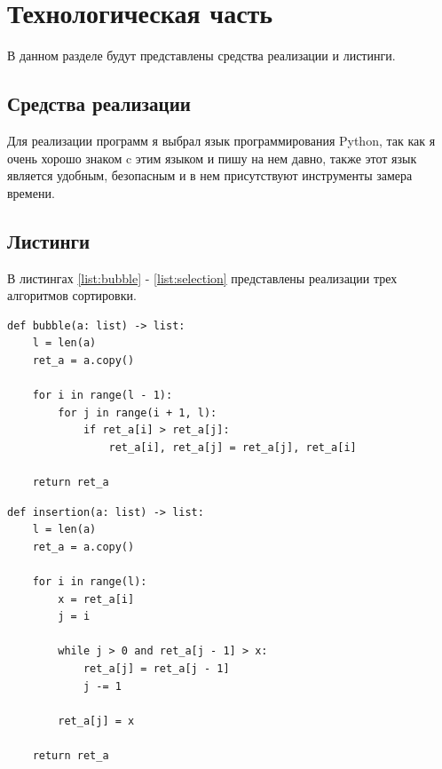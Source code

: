\documentclass[14pt,russian]{scrartcl}
\begin{document}
\section{Технологическая часть}

В данном разделе будут представлены средства реализации и листинги.

\subsection{Средства реализации}
Для реализации программ я выбрал язык программирования Python, так как я очень хорошо знаком c этим языком и пишу на нем давно, также этот язык является удобным, безопасным и в нем присутствуют инструменты замера времени.

\subsection{Листинги}

В листингах \ref{list:bubble} - \ref{list:selection} представлены реализации трех алгоритмов сортировки.

\begin{center}
\captionsetup{justification=raggedright, singlelinecheck=off}  
\begin{lstlisting}[label=list:bubble, caption=Функция сортировки массива методом пузырька]
def bubble(a: list) -> list:
    l = len(a)
    ret_a = a.copy()

    for i in range(l - 1):
        for j in range(i + 1, l):
            if ret_a[i] > ret_a[j]:
                ret_a[i], ret_a[j] = ret_a[j], ret_a[i]

    return ret_a
\end{lstlisting}
\end{center}

\begin{center}
\captionsetup{justification=raggedright, singlelinecheck=off}  
\begin{lstlisting}[label=list:insertion, caption=Функция сортировки массива методом вставок]
def insertion(a: list) -> list:
    l = len(a)
    ret_a = a.copy()

    for i in range(l):
        x = ret_a[i]
        j = i

        while j > 0 and ret_a[j - 1] > x:
            ret_a[j] = ret_a[j - 1]
            j -= 1

        ret_a[j] = x

    return ret_a
\end{lstlisting}
\end{center}
\end{document}
